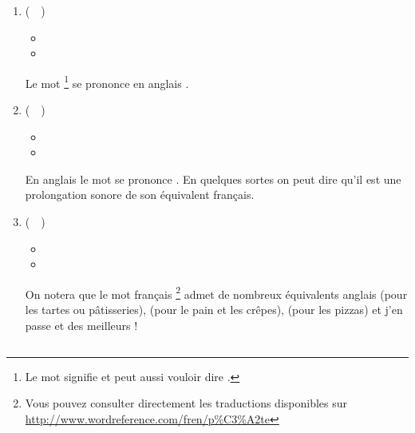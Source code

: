 \begin{enumerate}
\item {} (~~)
  \begin{itemize}
  \item {}
    \item {}
    \end{itemize}
    Le mot \footnote{Le mot  signifie  et
      peut aussi vouloir dire .} se prononce en anglais \href{https://en.oxforddictionaries.com/definition/stick}{}.
\item {} (~~)
  \begin{itemize}
  \item {}
  \item {}
  \end{itemize}
  En anglais le mot  se prononce
  \href{https://en.oxforddictionaries.com/definition/mast}{}. En
  quelques sortes on peut dire qu'il est une prolongation sonore de son
  équivalent français.

  \item {} (~~)
    \begin{itemize}
    \item {}
    \item {}
    \end{itemize}
    On notera que le mot français \footnote{Vous pouvez consulter
      directement les traductions disponibles sur \url{http://www.wordreference.com/fren/p\%C3\%A2te}} admet de nombreux
    équivalents anglais  (pour les tartes ou
    pâtisseries),  (pour le pain et les crêpes),
     (pour les pizzas) et j'en passe et des meilleurs ! 
\end{enumerate}

\subsection{}\label{subsec:efr}

